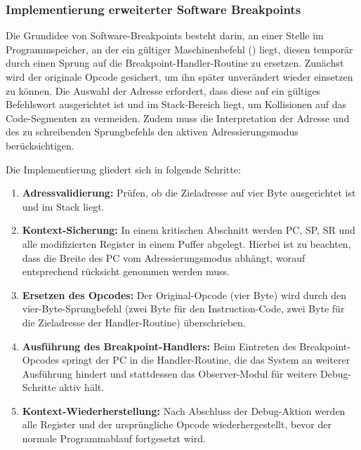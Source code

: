 \subsubsection{Implementierung erweiterter Software Breakpoints}
\label{sec:ImplementierungSoftwareBreakpoints}

Die Grundidee von Software-Breakpoints besteht darin, an einer Stelle im Programmspeicher, an der ein g\"ultiger Maschinenbefehl () liegt, diesen tempor\"ar durch einen Sprung auf die Breakpoint-Handler-Routine zu ersetzen. Zun\"achst wird der originale Opcode gesichert, um ihn sp\"ater unver\"andert wieder einsetzen zu k\"onnen. Die Auswahl der Adresse erfordert, dass diese auf ein g\"ultiges Befehlswort ausgerichtet ist und im Stack-Bereich liegt, um Kollisionen auf das Code-Segmenten zu vermeiden. Zudem muss die Interpretation der Adresse und des zu schreibenden Sprungbefehls den aktiven Adressierungsmodus berücksichtigen.

Die Implementierung gliedert sich in folgende Schritte:
\begin{enumerate}
	\item \textbf{Adressvalidierung:} Pr\"ufen, ob die Zieladresse auf vier Byte ausgerichtet ist und im Stack liegt.
	  
	\item \textbf{Kontext-Sicherung:} In einem kritischen Abschnitt werden PC, SP, SR und alle modifizierten Register in einem Puffer abgelegt. Hierbei ist zu beachten, dass die Breite des PC vom Adressierungsmodus abh\"angt, worauf entsprechend r\"ucksicht genommen werden muss. 
	
	\item \textbf{Ersetzen des Opcodes:} Der Original-Opcode (vier Byte) wird durch den vier-Byte-Sprungbefehl (zwei Byte f\"ur den Instruction-Code, zwei Byte f\"ur die Zieladresse der Handler-Routine) \"uberschrieben. 
	
	\item \textbf{Ausf\"uhrung des Breakpoint-Handlers:} Beim Eintreten des Breakpoint-Opcodes springt der PC in die Handler-Routine, die das System an weiterer Ausf\"uhrung hindert und stattdessen das Observer-Modul f\"ur weitere Debug-Schritte aktiv h\"alt.
	
	\item \textbf{Kontext-Wiederherstellung:} Nach Abschluss der Debug-Aktion werden alle Register und der urspr\"ungliche Opcode wiederhergestellt, bevor der normale Programmablauf fortgesetzt wird.
\end{enumerate}

